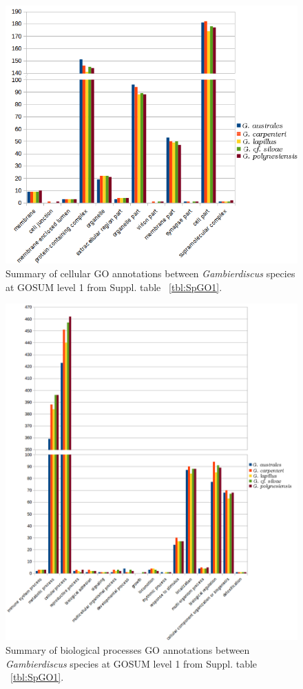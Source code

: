 \documentclass[12pt]{article}
\begin{document}
\begin{figure} 
\includegraphics[scale=.9]{3Aug18_cluster-investigation/figures/gosum-species/Species-gosum1-cell-split.png} 
\caption{Summary of cellular GO annotations between \textit{Gambierdiscus} species at GOSUM level 1 from Suppl. table ~\ref{tbl:SpGO1}.} 
\label{fig:SpecGo1Cell}
\end{figure} 


\begin{figure} 
\includegraphics[scale=.7]{3Aug18_cluster-investigation/figures/gosum-species/Species-gosum1-bio-split.png} 
\caption{Summary of biological processes GO annotations between \textit{Gambierdiscus} species at GOSUM level 1 from Suppl. table ~\ref{tbl:SpGO1}.} 
\label{fig:SpecGo1Bio}
\end{figure} 
\end{document}
